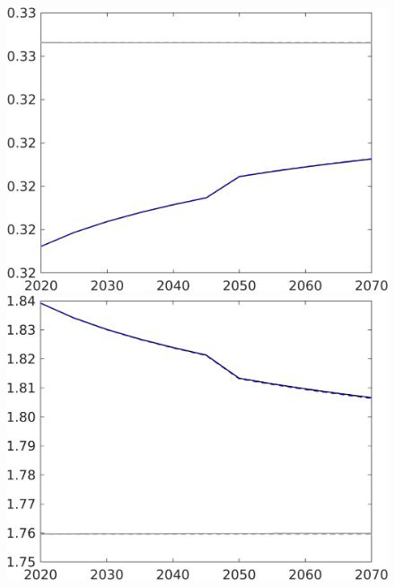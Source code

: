 \begin{figure}[h!!]
\begin{minipage}[]{0.32\textwidth}
 	\end{minipage}
 	\begin{minipage}[]{0.32\textwidth}
 		\includegraphics[width=1\textwidth]{../../codding_model/own_basedOnFried/optimalPol_190722_tidiedUp/figures/all_10Aout22/CountXgrTaulLF_target_hl_spillover0_sep1_extern0_PV1_etaa0.79_lgd0.png}
 	\end{minipage}
 	\begin{minipage}[]{0.32\textwidth}
 		\includegraphics[width=1\textwidth]{../../codding_model/own_basedOnFried/optimalPol_190722_tidiedUp/figures/all_10Aout22/CountXgrTaulLF_target_whwl_spillover0_sep1_extern0_PV1_etaa0.79_lgd0.png}

\end{minipage}
\end{figure}
